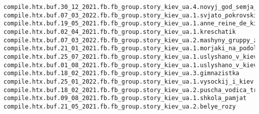 \begin{Verbatim}
compile.htx.buf.30_12_2021.fb.fb_group.story_kiev_ua.4.novyj_god_semja_1950
compile.htx.buf.07_03_2022.fb.fb_group.story_kiev_ua.1.svjato_pokrovskij_molitva
compile.htx.buf.19_05_2021.fb.fb_group.story_kiev_ua.1.anne_reine_de_kiev
compile.htx.buf.02_04_2021.fb.fb_group.story_kiev_ua.1.kreschatik
compile.htx.buf.07_03_2022.fb.fb_group.story_kiev_ua.2.mashyny_gruppy_zet
compile.htx.buf.21_01_2021.fb.fb_group.story_kiev_ua.1.morjaki_na_podole
compile.htx.buf.25_07_2021.fb.fb_group.story_kiev_ua.1.uslyshano_v_kieve_6
compile.htx.buf.01_08_2021.fb.fb_group.story_kiev_ua.1.uslyshano_v_kieve_9
compile.htx.buf.18_02_2021.fb.fb_group.story_kiev_ua.3.gimnazistka
compile.htx.buf.25_01_2022.fb.fb_group.story_kiev_ua.1.vysockij_i_kiev
compile.htx.buf.18_02_2021.fb.fb_group.story_kiev_ua.2.puscha_vodica_tramvaj_marshrut
compile.htx.buf.09_08_2021.fb.fb_group.story_kiev_ua.1.shkola_pamjat
compile.htx.buf.21_05_2021.fb.fb_group.story_kiev_ua.2.belye_rozy
\end{Verbatim}
